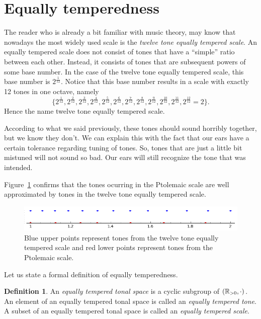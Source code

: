 \documentclass[a4paper]{book}
\theoremstyle{definition}
\newtheorem{definition}[theorem]{Definition}
\begin{document}
\section{Equally temperedness}
\label{section_equally_temperedness}
The reader who is already a bit familiar with music theory, may know that nowadays the most widely used scale is the \emph{twelve tone equally tempered scale}.
An equally tempered scale does not consist of tones that have a ``simple'' ratio between each other.
Instead, it consists of tones that are subsequent powers of some base number.
In the case of the twelve tone equally tempered scale, this base number is $2^\frac{1}{12}$.
Notice that this base number results in a scale with exactly 12 tones in one octave, namely \[\{2^\frac{1}{12},2^\frac{2}{12},2^\frac{3}{12},2^\frac{4}{12},2^\frac{5}{12},2^\frac{6}{12},2^\frac{7}{12},2^\frac{8}{12},2^\frac{9}{12},2^\frac{10}{12},2^\frac{11}{12}, 2^\frac{12}{12} = 2\}.\]
Hence the name twelve tone equally tempered scale.

According to what we said previously, these tones should sound horribly together, but we know they don't.
We can explain this with the fact that our ears have a certain tolerance regarding tuning of tones.
So, tones that are just a little bit mistuned will not sound so bad.
Our ears will still recognize the tone that was intended.

Figure~\ref{equally_temperedness} confirms that the tones ocurring in the Ptolemaic scale are well approximated by tones in the twelve tone equally tempered scale.

\begin{figure}[H]
    \centering
    \includegraphics[scale=0.65]{figures/equally_temperedness.png}
    \caption{Blue upper points represent tones from the twelve tone equally tempered scale and red lower points represent tones from the Ptolemaic scale.}
    \label{equally_temperedness}
\end{figure}

Let us state a formal definition of equally temperedness.

\begin{definition}
    An \emph{equally tempered tonal space} is a cyclic subgroup of $(\mathbb{R}_{> 0},\cdot)$.
    An element of an equally tempered tonal space is called an \emph{equally tempered tone}.
    A subset of an equally tempered tonal space is called an \emph{equally tempered scale}.
\end{definition}
\end{document}
